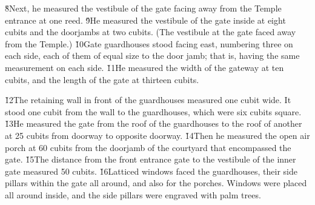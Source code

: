 \v{8}Next, he measured the vestibule of the gate facing away from the Temple entrance at one reed. \v{9}He measured the vestibule of the gate inside at eight cubits and the doorjambs at two cubits. (The vestibule at the gate faced away from the Temple.) \v{10}Gate guardhouses stood facing east, numbering three on each side, each of them of equal size to the door jamb; that is, having the same measurement on each side. \v{11}He measured the width of the gateway at ten cubits, and the length of the gate at thirteen cubits.

\v{12}The retaining wall in front of the guardhouses measured one cubit wide. It stood one cubit from the wall to the guardhouses, which were six cubits square. \v{13}He measured the gate from the roof of the guardhouses to the roof of another at 25 cubits from doorway to opposite doorway. \v{14}Then he measured the open air porch at 60 cubits from the doorjamb of the courtyard that encompassed the gate. \v{15}The distance from the front entrance gate to the vestibule of the inner gate measured 50 cubits. \v{16}Latticed windows faced the guardhouses, their side pillars within the gate all around, and also for the porches. Windows were placed all around inside, and the side pillars were engraved with palm trees.

